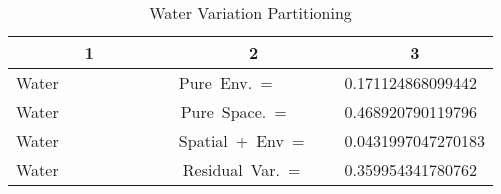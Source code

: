 \documentclass[11pt]{article}
\begin{document}
\begin{table}[hptb]
\caption{Water Variation Partitioning\label{water.table}}
\begin{center}
\begin{tabular}{|c|c|c|} \hline
\multicolumn{1}{|c|}{1}&\multicolumn{1}{c|}{2}&\multicolumn{1}{c|}{3}\\ \hline
Water~~~~~~~~~~~~~&Pure~Env.~=~~~~~~~&0.171124868099442~\\ 
Water~~~~~~~~~~~~~&Pure~Space.~=~~~~~&0.468920790119796~\\ 
Water~~~~~~~~~~~~~&Spatial~+~Env~=~~~&0.0431997047270183\\ 
Water~~~~~~~~~~~~~&Residual~Var.~=~~~&0.359954341780762~\\ 
\hline
\end{tabular}
\vspace{3mm}
\end{center}
\end{table}
\end{document}
